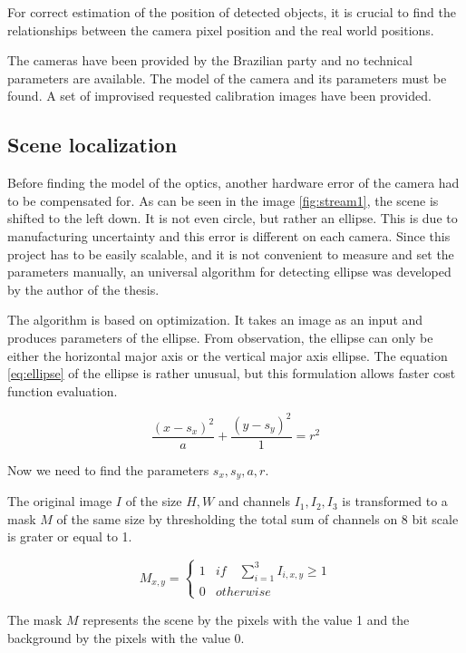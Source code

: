 \documentclass[a4paper,12pt,titlepage, twoside]{article}
\numberwithin{figure}{section}
\begin{document}
For correct estimation of the position of detected objects, it is crucial to find the relationships between the camera pixel position and the real world positions. 

The cameras have been provided by the Brazilian party and no technical parameters are available. The model of the camera and its parameters must be found. A set of improvised requested calibration images have been provided.

\subsection{Scene localization}
\label{sec:scene_localization}
Before finding the model of the optics, another hardware error of the camera had to be compensated for. As can be seen in the image \ref{fig:stream1}, the scene is shifted to the left down. It is not even circle, but rather an ellipse. This is due to manufacturing uncertainty and this error is different on each camera. Since this project has to be easily scalable, and it is not convenient to measure and set the parameters manually, an universal algorithm for detecting ellipse was developed by the author of the thesis.

The algorithm is based on optimization. It takes an image as an input and produces parameters of the ellipse. From observation, the ellipse can only be either the horizontal major axis or the vertical major axis ellipse. The equation \ref{eq:ellipse} of the ellipse is rather unusual, but this formulation allows faster cost function evaluation.

\begin{equation}
\label{eq:ellipse}
\frac{(x-s_x)^2}{a} + \frac{(y-s_y)^2}{1} = r^2
\end{equation}

Now we need to find the parameters $s_x, s_y, a, r$.

The original image $I$ of the size $H, W$ and channels $I_1, I_2, I_3$ is transformed to a mask $M$ of the same size by thresholding the total sum of channels on 8 bit scale is grater or equal to 1. \cite{lukacs1997real}

\begin{equation}
M_{x,y} = \begin{cases}
1 & if \quad \sum_{i=1}^{3} I_{i,x,y} \geq 1 \\
0 & otherwise
\end{cases}
\end{equation}

The mask $M$ represents the scene by the pixels with the value 1 and the background by the pixels with the value 0. 
\end{document}
